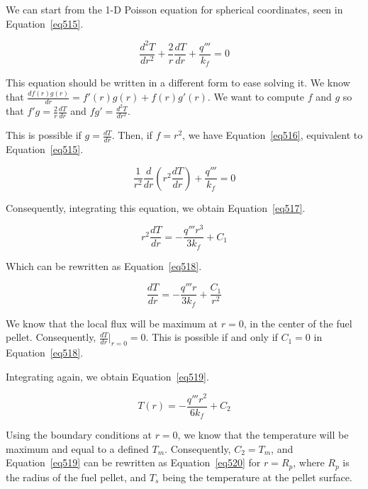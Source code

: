 We can start from the 1-D Poisson equation for spherical coordinates, seen in Equation~\ref{eq515}.


\begin{equation}\label{eq515}
\frac{d^2T}{dr^2} + \frac{2}{r}\frac{dT}{dr} + \frac{q'''}{k_f} = 0
\end{equation}

This equation should be written in a different form to ease solving it. We know that $\frac{df(r)g(r)}{dr} = f'(r)g(r) + f(r)g'(r)$. We want to compute $f$ and $g$ so that $f'g = \frac{2}{r}\frac{dT}{dr}$ and $fg' = \frac{d^2T}{dr^2}$.

This is possible if $g = \frac{dT}{dr}$. Then, if $f = r^2$, we have Equation~\ref{eq516}, equivalent to Equation~\ref{eq515}.


\begin{equation}\label{eq516}
\frac{1}{r^2}\frac{d}{dr}\left(r^2\frac{dT}{dr} \right) + \frac{q'''}{k_f} = 0
\end{equation}

Consequently, integrating this equation, we obtain Equation~\ref{eq517}.


\begin{equation}\label{eq517}
r^2\frac{dT}{dr} = - \frac{q'''r^3}{3k_f} + C_1
\end{equation}

Which can be rewritten as Equation~\ref{eq518}.

\begin{equation}\label{eq518}
\frac{dT}{dr} = - \frac{q'''r}{3k_f} + \frac{C_1}{r^2}
\end{equation}

We know that the local flux will be maximum at $r=0$, in the center of the fuel pellet. Consequently, $\frac{dT}{dr}\bigg\rvert_{r=0} = 0$. This is possible if and only if $C_1 = 0$ in Equation~\ref{eq518}.

Integrating again, we obtain Equation~\ref{eq519}.


\begin{equation}\label{eq519}
T(r) = - \frac{q'''r^2}{6k_f} + C_2
\end{equation}

Using the boundary conditions at $r=0$, we know that the temperature will be maximum and equal to a defined $T_m$. Consequently, $C_2 = T_m$, and Equation~\ref{eq519} can be rewritten as Equation~\ref{eq520} for $r=R_p$, where $R_p$ is the radius of the fuel pellet, and $T_s$ being the temperature at the pellet surface.


